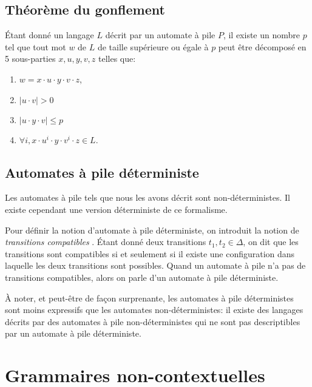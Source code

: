 \subsection{Théorème du gonflement}

Étant donné un langage $L$ décrit par un automate à pile $P$, il existe un nombre $p$ tel que tout mot $w$ de $L$ de taille supérieure ou égale à $p$ peut être décomposé en 5 sous-parties $x, u, y, v, z$ telles que:
\begin{enumerate}
\item $w = x \cdot u \cdot y \cdot v \cdot z$,
\item $|u \cdot v| > 0$
\item $|u \cdot y \cdot v| \leq p$
\item $\forall i, x \cdot u^i \cdot y \cdot v^i \cdot z \in L$. 
\end{enumerate}

\subsection{Automates à pile déterministe}

Les automates à pile tels que nous les avons décrit sont non-déterministes.
Il existe cependant une version déterministe de ce formalisme.

Pour définir la notion d'automate à pile déterministe, on introduit la notion de \og \textit{transitions compatibles} \fg{}.
Étant donné deux transitions $t_1, t_2 \in \Delta$, on dit que les transitions sont compatibles si et seulement si il existe une configuration dans laquelle les deux transitions sont possibles.
Quand un automate à pile n'a pas de transitions compatibles, alors on parle d'un automate à pile déterministe.

À noter, et peut-être de façon surprenante, les automates à pile déterministes sont moins expressifs que les automates non-déterministes:
il existe des langages décrits par des automates à pile non-déterministes qui ne
sont pas descriptibles par un automate à pile déterministe.

\section{Grammaires non-contextuelles}

